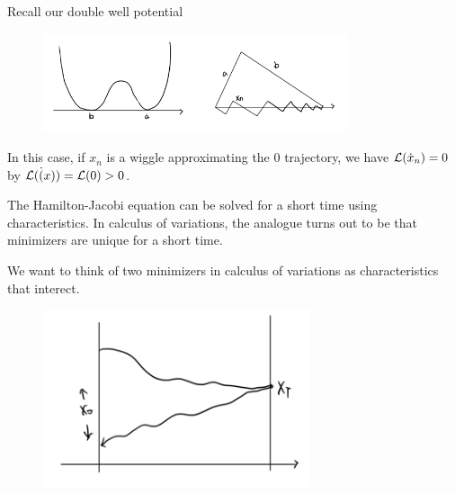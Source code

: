 \begin{example}
Recall our double well potential
\begin{figure}[H]
    \centering
    \includegraphics[width=0.8\textwidth]{pics/9-1.png}
\end{figure}
In this case, if $x_n$ is a wiggle approximating the $0$ trajectory, we have $\mathcal{L}(\dot x_n)=0$ by $\mathcal{L}(\dot(x)) = \mathcal{L}(0) >0$.
\end{example}

\begin{remark}
    The Hamilton-Jacobi equation can be solved for a short time using characteristics. In calculus of variations, the analogue turns out to be that minimizers are unique for a short time.
\end{remark}

We want to think of two minimizers in calculus of variations as characteristics that interect. 
\begin{figure}[H]
    \centering
    \includegraphics[width=0.7\textwidth]{pics/9-2.png}
\end{figure}
